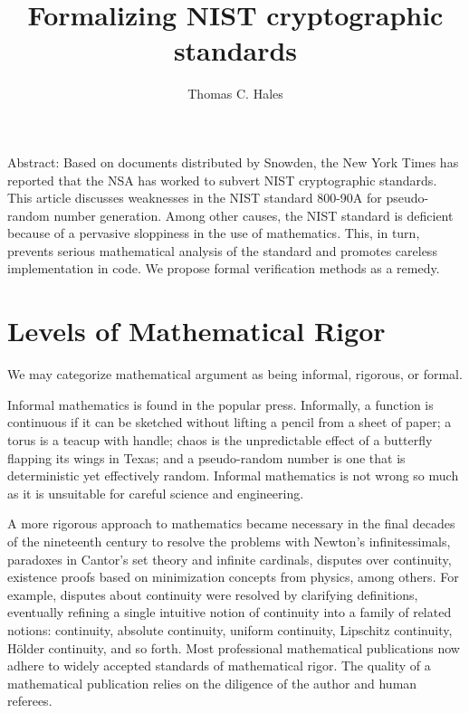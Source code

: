 \documentclass[11pt]{amsart} %
\begin{document}
\title{Formalizing NIST cryptographic standards}
\author{Thomas C. Hales} 
\maketitle


Abstract:  Based on documents distributed by Snowden, the New York Times has reported that 
the NSA has worked to subvert NIST cryptographic standards.  
This article discusses weaknesses in the NIST standard 800-90A for pseudo-random number
generation.
Among other causes, the NIST standard is deficient because of a pervasive sloppiness in the use of
mathematics.
This, in turn, prevents serious mathematical analysis of the standard and promotes careless implementation in code.
We propose formal verification methods as a remedy.

\section{Levels of Mathematical Rigor}

We may categorize mathematical argument as being
 informal,  rigorous, or formal.


Informal mathematics is found in the popular press.
Informally, a function is continuous if it can be sketched without lifting a pencil from a sheet of paper;
a torus is a teacup with handle; chaos is the unpredictable
effect of a butterfly flapping its wings in Texas; and 
a pseudo-random number is one that is deterministic yet effectively random.
Informal mathematics is not wrong so much as it is unsuitable for careful science
and engineering.

 A more rigorous approach
to mathematics became necessary in the final decades of the nineteenth century  
to resolve the problems with Newton's infinitessimals,
paradoxes in Cantor's set theory and infinite cardinals, 
disputes over continuity, existence proofs based on  minimization concepts from physics,
among others.
For example, disputes about continuity were resolved by clarifying definitions,
eventually refining a single intuitive notion of continuity into a family of related notions: 
continuity, absolute continuity, uniform continuity, Lipschitz continuity, H\"older continuity,
and so forth.  Most professional mathematical publications now adhere to widely accepted 
standards of mathematical
rigor.  The quality of a mathematical publication relies on the diligence of the author and human referees.
\end{document}
